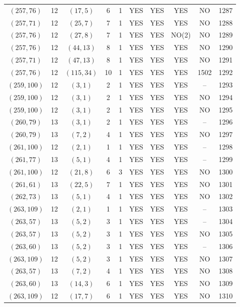 \begin{longtable}{|c|c|c|c|c|c|c|c|c|c|}
$(257, 76)$ & 12 & $(17, 5)$ & 6 & 1 & YES & YES & YES & NO & 1287\\
$(257, 71)$ & 12 & $(25, 7)$ & 7 & 1 & YES & YES & YES & NO & 1288\\
$(257, 76)$ & 12 & $(27, 8)$ & 7 & 1 & YES & YES & NO(2) & NO & 1289\\
$(257, 76)$ & 12 & $(44, 13)$ & 8 & 1 & YES & YES & YES & NO & 1290\\
$(257, 71)$ & 12 & $(47, 13)$ & 8 & 1 & YES & YES & YES & NO & 1291\\
$(257, 76)$ & 12 & $(115, 34)$ & 10 & 1 & YES & YES & YES & 1502 & 1292\\
$(259, 100)$ & 12 & $(3, 1)$ & 2 & 1 & YES & YES & YES & -- & 1293\\
$(259, 100)$ & 12 & $(3, 1)$ & 2 & 1 & YES & YES & YES & NO & 1294\\
$(259, 100)$ & 12 & $(3, 1)$ & 2 & 1 & YES & YES & YES & NO & 1295\\
$(260, 79)$ & 13 & $(3, 1)$ & 2 & 1 & YES & YES & YES & -- & 1296\\
$(260, 79)$ & 13 & $(7, 2)$ & 4 & 1 & YES & YES & YES & NO & 1297\\
$(261, 100)$ & 12 & $(2, 1)$ & 1 & 1 & YES & YES & YES & -- & 1298\\
$(261, 77)$ & 13 & $(5, 1)$ & 4 & 1 & YES & YES & YES & -- & 1299\\
$(261, 100)$ & 12 & $(21, 8)$ & 6 & 3 & YES & YES & YES & NO & 1300\\
$(261, 61)$ & 13 & $(22, 5)$ & 7 & 1 & YES & YES & YES & NO & 1301\\
$(262, 73)$ & 13 & $(5, 1)$ & 4 & 1 & YES & YES & YES & NO & 1302\\
$(263, 109)$ & 12 & $(2, 1)$ & 1 & 1 & YES & YES & YES & -- & 1303\\
$(263, 57)$ & 13 & $(5, 2)$ & 3 & 1 & YES & YES & YES & -- & 1304\\
$(263, 57)$ & 13 & $(5, 2)$ & 3 & 1 & YES & YES & YES & NO & 1305\\
$(263, 60)$ & 13 & $(5, 2)$ & 3 & 1 & YES & YES & YES & -- & 1306\\
$(263, 109)$ & 12 & $(5, 2)$ & 3 & 1 & YES & YES & YES & NO & 1307\\
$(263, 57)$ & 13 & $(7, 2)$ & 4 & 1 & YES & YES & YES & NO & 1308\\
$(263, 60)$ & 13 & $(14, 3)$ & 6 & 1 & YES & YES & YES & NO & 1309\\
$(263, 109)$ & 12 & $(17, 7)$ & 6 & 1 & YES & YES & YES & NO & 1310\\

\end{longtable}
